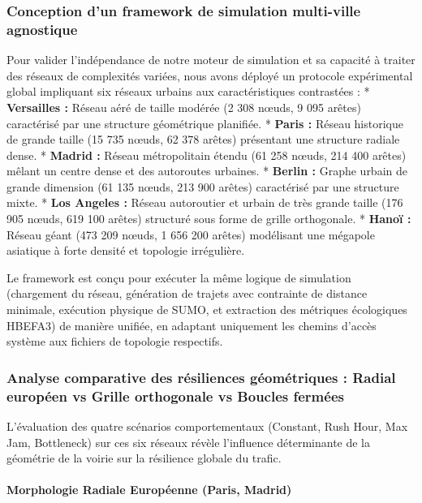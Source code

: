 \documentclass[11pt, a4paper]{article}
\begin{document}
\subsubsection{Conception d'un framework de simulation multi-ville
agnostique}\label{conception-dun-framework-de-simulation-multi-ville-agnostique}

Pour valider l'indépendance de notre moteur de simulation et sa capacité
à traiter des réseaux de complexités variées, nous avons déployé un
protocole expérimental global impliquant six réseaux urbains aux
caractéristiques contrastées : * \textbf{Versailles :} Réseau aéré de
taille modérée (2 308 nœuds, 9 095 arêtes) caractérisé par une structure
géométrique planifiée. * \textbf{Paris :} Réseau historique de grande
taille (15 735 nœuds, 62 378 arêtes) présentant une structure radiale
dense. * \textbf{Madrid :} Réseau métropolitain étendu (61 258 nœuds,
214 400 arêtes) mêlant un centre dense et des autoroutes urbaines. *
\textbf{Berlin :} Graphe urbain de grande dimension (61 135 nœuds, 213
900 arêtes) caractérisé par une structure mixte. * \textbf{Los Angeles
:} Réseau autoroutier et urbain de très grande taille (176 905 nœuds,
619 100 arêtes) structuré sous forme de grille orthogonale. *
\textbf{Hanoï :} Réseau géant (473 209 nœuds, 1 656 200 arêtes)
modélisant une mégapole asiatique à forte densité et topologie
irrégulière.

Le framework est conçu pour exécuter la même logique de simulation
(chargement du réseau, génération de trajets avec contrainte de distance
minimale, exécution physique de SUMO, et extraction des métriques
écologiques HBEFA3) de manière unifiée, en adaptant uniquement les
chemins d'accès système aux fichiers de topologie respectifs.

\subsubsection{Analyse comparative des résiliences géométriques : Radial
européen vs Grille orthogonale vs Boucles
fermées}\label{analyse-comparative-des-ruxe9siliences-guxe9omuxe9triques-radial-europuxe9en-vs-grille-orthogonale-vs-boucles-fermuxe9es}

L'évaluation des quatre scénarios comportementaux (Constant, Rush Hour,
Max Jam, Bottleneck) sur ces six réseaux révèle l'influence déterminante
de la géométrie de la voirie sur la résilience globale du trafic.

\paragraph{Morphologie Radiale Européenne (Paris,
Madrid)}\label{morphologie-radiale-europuxe9enne-paris-madrid}
\end{document}
